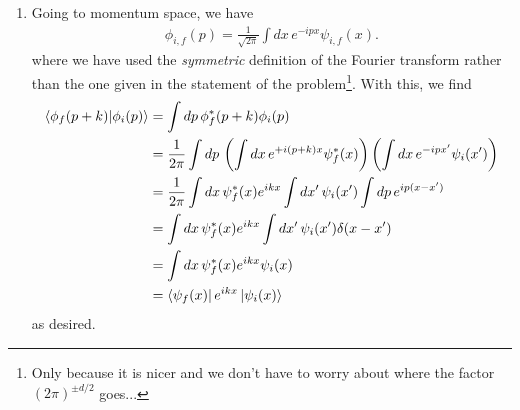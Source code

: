 \documentclass{article}
\theoremstyle{definition}
\newcommand{\f}[2]{\frac{#1}{#2}}
\newcommand{\lp}{\left(}
\newcommand{\rp}{\right)}
\begin{document}
\begin{enumerate}[label = (\alph*)]
	\item Going to momentum space, we have 
	\begin{align*}
	\phi_{i,f}(p) =  \f{1}{\sqrt{2\pi }} \int dx\, e^{-ipx}\psi_{i,f}(x). 
	\end{align*}
	where we have used the \textit{symmetric} definition of the Fourier transform rather than the one given in the statement of the problem\footnote{Only because it is nicer and we don't have to worry about where the factor $(2\pi)^{\pm d/2}$ goes...}.  With this, we find 
	\begin{align*}
	\bra{\phi_f(p+k)} \ket{\phi_i(p)} 
	&=  \int dp\, \phi_f^*(p+k) \phi_i(p) \\
	&= \f{1}{2\pi}\int  dp\, \lp \int dx\, e^{+i(p+k)x}\psi_{f}^*(x)\rp \lp \int dx\, e^{-ipx'}\psi_{i}(x')\rp \\
	&= \f{1}{2\pi} \int dx \, \psi_f^*(x) e^{ikx} \int dx'\, \psi_i(x') \int dp\, e^{ip(x-x')} \\
	&=  \int dx \, \psi_f^*(x) e^{ikx} \int dx'\, \psi_i(x') \delta(x-x')\\
	&= \int dx\, \psi_f^*(x) e^{ikx}\psi_i(x)\\
	&= \bra{\psi_f(x)} e^{ikx} \ket{\psi_i(x)}
	\end{align*}
	as desired. 
	

\end{enumerate}
\end{document}
